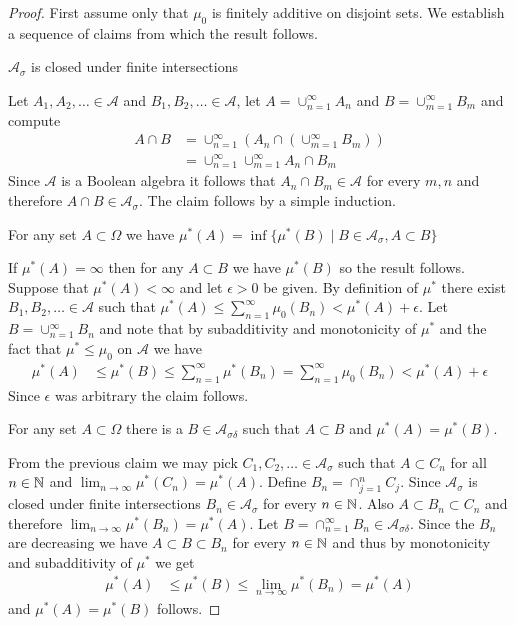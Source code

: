 \begin{proof}
First assume only that $\mu_0$ is finitely additive on disjoint sets.
We establish a sequence of claims from which the result follows.
\begin{clm}$\mathcal{A}_\sigma$ is closed under finite intersections
\end{clm}
Let $A_1, A_2, \dotsc \in \mathcal{A}$ and $B_1, B_2, \dotsc \in \mathcal{A}$, let $A = \cup_{n=1}^\infty A_n$ and $B=\cup_{m=1}^\infty B_m$ and compute
\begin{align*}
A \cap B  &=\cup_{n=1}^\infty  \left ( A_n  \cap \left ( \cup_{m=1}^\infty B_m  \right ) \right )\\
&=\cup_{n=1}^\infty \cup_{m=1}^\infty A_n  \cap B_m 
\end{align*}
Since $\mathcal{A}$ is a Boolean algebra it follows that $A_n \cap B_m \in \mathcal{A}$ for every $m,n$ and therefore $A \cap B \in \mathcal{A}_\sigma$.  The claim follows by a simple induction.

\begin{clm}For any set $A \subset \Omega$ we have $\mu^*(A) = \inf \lbrace \mu^*(B) \mid B \in \mathcal{A}_\sigma, A \subset B \rbrace$
\end{clm}
If $\mu^*(A) = \infty$ then for any $A \subset B$ we have $\mu^*(B)$ so the result follows.  Suppose that $\mu^*(A) < \infty$ and let $\epsilon > 0$ be given.  By definition of $\mu^*$ there exist $B_1, B_2, \dotsc \in \mathcal{A}$ such that $\mu^*(A) \leq \sum_{n=1}^\infty \mu_0(B_n) < \mu^*(A) + \epsilon$.  Let $B = \cup_{n=1}^\infty B_n$ and note that by subadditivity and monotonicity of $\mu^*$ and the fact that $\mu^* \leq \mu_0$ on $\mathcal{A}$ we have  
\begin{align*}
\mu^*(A) &\leq \mu^*(B) \leq \sum_{n=1}^\infty \mu^*(B_n) = \sum_{n=1}^\infty \mu_0(B_n) < \mu^*(A) + \epsilon
\end{align*}  
Since $\epsilon$ was arbitrary the claim follows.

\begin{clm}For any set $A \subset \Omega$ there is a $B \in \mathcal{A}_{\sigma \delta}$ such that $A \subset B$ and $\mu^*(A) = \mu^*(B)$.
\end{clm}
From the previous claim we may pick $C_1, C_2, \dotsc \in \mathcal{A}_\sigma$ such that $A \subset C_n$ for all $n \in \mathbb{N}$ and $\lim_{n \to \infty} \mu^*(C_n) = \mu^*(A)$.  Define $B_n = \cap_{j=1}^n C_j$.  Since $\mathcal{A}_\sigma$ is closed under finite intersections $B_n \in \mathcal{A}_\sigma$ for every $n \in \mathbb{N}$.  Also $A \subset B_n \subset C_n$ and therefore 
$\lim_{n \to \infty} \mu^*(B_n) = \mu^*(A)$.  Let $B = \cap_{n =1}^\infty B_n \in \mathcal{A}_{\sigma \delta}$.   Since the $B_n$ are decreasing we have $A \subset B \subset B_n$ for every $n \in \mathbb{N}$ and thus by monotonicity and subadditivity of $\mu^*$ we get
\begin{align*}
\mu^*(A) &\leq \mu^*(B) \leq \lim_{n \to \infty}\mu^*(B_n) = \mu^*(A)
\end{align*}
and $\mu^*(A)=\mu^*(B)$ follows.


\end{proof}
